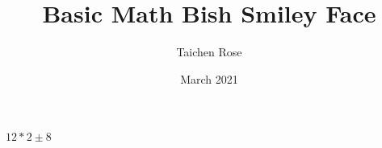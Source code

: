\documentclass{article}
\title{Basic Math Bish Smiley Face}
\author{Taichen Rose}
\date{March 2021}
\begin{document}
$12*2 \pm 8$
\end{document}
